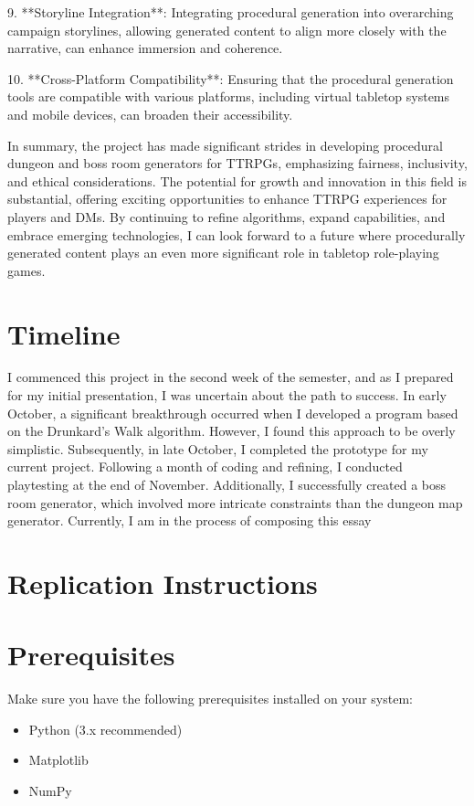 \documentclass[10pt,twocolumn]{article}
\begin{document}
9. **Storyline Integration**: Integrating procedural generation into overarching campaign storylines, allowing generated content to align more closely with the narrative, can enhance immersion and coherence.

10. **Cross-Platform Compatibility**: Ensuring that the procedural generation tools are compatible with various platforms, including virtual tabletop systems and mobile devices, can broaden their accessibility.

In summary, the project has made significant strides in developing procedural dungeon and boss room generators for TTRPGs, emphasizing fairness, inclusivity, and ethical considerations. The potential for growth and innovation in this field is substantial, offering exciting opportunities to enhance TTRPG experiences for players and DMs. By continuing to refine algorithms, expand capabilities, and embrace emerging technologies, I can look forward to a future where procedurally generated content plays an even more significant role in tabletop role-playing games.


\section{Timeline}

I commenced this project in the second week of the semester, and as I prepared for my initial presentation, I was uncertain about the path to success. In early October, a significant breakthrough occurred when I developed a program based on the Drunkard's Walk algorithm. However, I found this approach to be overly simplistic. Subsequently, in late October, I completed the prototype for my current project. Following a month of coding and refining, I conducted playtesting at the end of November. Additionally, I successfully created a boss room generator, which involved more intricate constraints than the dungeon map generator. Currently, I am in the process of composing this essay

\section{Replication Instructions}
\section{Prerequisites}

Make sure you have the following prerequisites installed on your system:

\begin{itemize}
    \item Python (3.x recommended)
    \item Matplotlib
    \item NumPy
\end{itemize}
\end{document}
